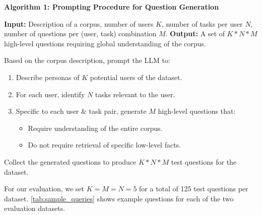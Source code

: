 \documentclass{article}
\begin{document}
\noindent\hrulefill

\vspace{-5px}
\textbf{Algorithm 1: Prompting Procedure for Question Generation}

\vspace{-10px}
\noindent\hrulefill

\begin{algorithmic}[1]
\State \textbf{Input:} Description of a corpus, number of users $K$, number of tasks per user $N$, number of questions per (user, task) combination $M$.
\State \textbf{Output:} A set of $K*N*M$ high-level questions requiring global understanding of the corpus.

    \State Based on the corpus description, prompt the LLM to:
    \begin{enumerate}
        \item Describe personas of $K$ potential users of the dataset.
        \item For each user, identify $N$ tasks relevant to the user.
        \item Specific to each user \& task pair, generate $M$ high-level questions that:
        \begin{itemize}
            \item Require understanding of the entire corpus.
            \item Do not require retrieval of specific low-level facts.
        \end{itemize}
    \end{enumerate}
    \State Collect the generated questions to produce $K*N*M$ test questions for the dataset.
\EndProcedure
\end{algorithmic}
\noindent\hrulefill
\label{alg:question_generation}

For our evaluation, we set $K=M=N=5$ for a total of 125 test questions per dataset.
\autoref{tab:sample_queries} shows example questions for each of the two evaluation datasets.
\FloatBarrier
\end{document}
